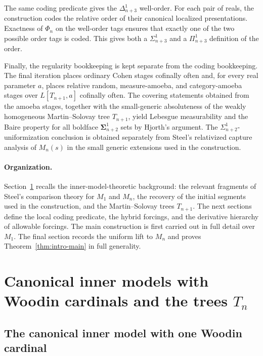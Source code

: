 \documentclass[a4paper,11pt]{article}
\begin{document}
The same coding predicate gives the $\Delta^1_{n+3}$ well-order.  For each
pair of reals, the construction codes the relative order of their canonical
localized presentations.  Exactness of $\Phi_n$ on the well-order tags
ensures that exactly one of the two possible order tags is coded.  This gives
both a $\Sigma^1_{n+3}$ and a $\Pi^1_{n+3}$ definition of the order.

Finally, the regularity bookkeeping is kept separate from the coding
bookkeeping.  The final iteration places ordinary Cohen stages cofinally
often and, for every real parameter $a$, places relative random,
measure-amoeba, and category-amoeba stages over $L[T_{n+1},a]$ cofinally
often.  The covering statements obtained from the amoeba stages, together
with the small-generic absoluteness of the weakly homogeneous
Martin--Solovay tree $T_{n+1}$, yield Lebesgue measurability and the Baire
property for all boldface $\boldsymbol\Sigma^1_{n+2}$ sets by Hjorth's
argument.  The $\Sigma^1_{n+2}$-uniformization conclusion is obtained
separately from Steel's relativized capture analysis of $M_n(s)$ in the
small generic extensions used in the construction.

\paragraph{Organization.}
Section~\ref{sec:canonical-inner-models} recalls the inner-model-theoretic
background: the relevant fragments of Steel's comparison theory for $M_1$
and $M_n$, the recovery of the initial segments used in the construction,
and the Martin--Solovay trees $T_{n+1}$.  The next sections define the local
coding predicate, the hybrid forcings, and the derivative hierarchy of
allowable forcings.  The main construction is first carried out in full
detail over $M_1$.  The final section records the uniform lift to $M_n$ and
proves Theorem~\ref{thm:intro-main} in full generality.


\section{Canonical inner models with Woodin cardinals and the trees $T_n$}\label{sec:canonical-inner-models}

\subsection{The canonical inner model with one Woodin cardinal}\label{subsec:m1-background}
\end{document}
